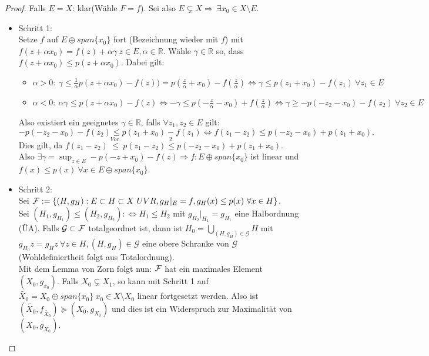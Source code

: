 \documentclass[ngerman]{report}
\theoremstyle{plain}%
\theoremstyle{definition}%
\theoremstyle{myStyle}
\newcommand{\R}{\mathbb{R}}
\newcommand{\df}[1][]{%
	\overset{#1}{\Rightarrow}
}
\newcommand{\disp}{\displaystyle}
\begin{document}
	\begin{proof}
		Falls $E=X$: klar(Wähle $F=f$). Sei also $E\subsetneq X \df ~\exists x_0 \in X\setminus E$.
		\begin{itemize}[]
			\item Schritt 1: \\
				Setze $f$ auf $E\oplus span\{x_0\}$ fort (Bezeichnung wieder mit $f$) mit $f(z+\alpha x_0)=f(z)+\alpha\gamma ~z\in E, \alpha \in \R$. Wähle $\gamma \in \R$ so, dass $f(z+\alpha x_0)\leq p(z + \alpha x_0).$ Dabei gilt:

				\begin{itemize}[]
					\item $\alpha > 0: ~\gamma\leq\frac{1}{\alpha}p(z+\alpha x_0)-f(z))=p(\frac{z}{\alpha} +x_0)-f(\frac{z}{\alpha}) \Leftrightarrow \gamma\leq p(z_1+ x_0)-f(z_1) ~\forall z_1 \in E$
					\item $\alpha < 0: ~\alpha\gamma\leq p(z+\alpha x_0)-f(z) \Leftrightarrow -\gamma \leq p(-\frac{z}{\alpha} -x_0)+f(\frac{z}{\alpha}) \Leftrightarrow \gamma\geq -p(-z_2 -x_0)-f(z_2) ~\forall z_2 \in E$
				\end{itemize}

		Also existiert ein geeignetes $\gamma \in \R$, falls $\forall z_1,z_2 \in E$ gilt:
		$$-p(-z_2 -x_0)-f(z_2) \leq p(z_1+ x_0)-f(z_1) \Leftrightarrow f(z_1-z_2) \leq p(-z_2-x_0)+p(z_1+x_0). $$ 
		Dies gilt, da $ f(z_1-z_2) \overset{Vor.}{\leq} p(z_1-z_2) \overset{2.}{\leq} p(-z_2-x_0) + p(z_1 + x_0)$.\\
		Also $\exists \gamma = \disp \sup_{z \in E} -p(-z+x_0)-f(z) \df f:E \oplus span\{x_0\}$ ist linear und $f(x)\leq p(x) ~\forall x \in E \oplus span\{x_0\}$.
	
		\item Schritt 2: \\
		Sei $\mathcal{F}:=\{(H,g_H):E \subset H \subset X ~UVR, g_H|_E=f, g_H(x) \leq p(x) ~\forall x \in H\}$. \\
		Sei $(H_1,g_{H_1}) \leq (H_2,g_{H_2}) :\Leftrightarrow H_1 \leq H_2$ mit $g_{H_2}|_{H_1} = g_{H_1}$ eine Halbordnung (ÜA). Falls $\mathcal{G} \subset \mathcal{F}$ totalgeordnet ist, dann ist $\disp H_0=\bigcup_{(H,g_H) \in \mathcal{G}} H$ mit $g_{H_0}z=g_H z ~\forall z \in H, (H,g_H) \in \mathcal{G}$ eine obere Schranke von $\mathcal{G}$ (Wohldefiniertheit folgt aus Totalordnung). \\
		Mit dem Lemma von Zorn folgt nun: $\mathcal{F}$ hat ein maximales Element $(X_0,g_{x_0})$.
		Falls $X_0 \subsetneq X_1$, so kann mit Schritt 1 auf $\tilde{X_0}=X_0 \oplus span\{x_0\} ~x_0 \in X\setminus X_0$ linear fortgesetzt werden.  Also ist $(\tilde{X_0},f_{\tilde{X_0}})\succeq(X_0,g_{X_0}) $ und dies ist ein Widerspruch zur Maximalität von $(X_0,g_{X_0})$.
		\end{itemize}
	\end{proof}
\end{document}
